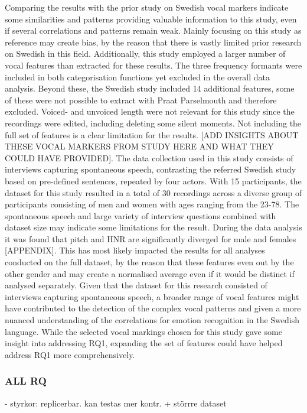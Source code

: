 Comparing the results with the prior study on Swedish vocal markers indicate some similarities and patterns providing valuable information to this study, even if several correlations and patterns remain weak. Mainly focusing on this study as reference may create bias, by the reason that there is vastly limited prior research on Swedish in this field. Additionally, this study employed a larger number of vocal features than extracted for these results. The three frequency formants were included in both categorisation functions yet excluded in the overall data analysis. Beyond these, the Swedish study included 14 additional features, some of these were not possible to extract with Praat Parselmouth and therefore excluded. Voiced- and unvoiced length were not relevant for this study since the recordings were edited, including deleting some silent moments. Not including the full set of features is a clear limitation for the results. [ADD INSIGHTS ABOUT THESE VOCAL MARKERS FROM STUDY HERE AND WHAT THEY COULD HAVE PROVIDED]. The data collection used in this study consists of interviews capturing spontaneous speech, contrasting the referred Swedish study based on pre-defined sentences, repeated by four actors. With 15 participants, the dataset for this study resulted in a total of 30 recordings across a diverse group of participants consisting of men and women with ages ranging from the 23-78. The spontaneous speech and large variety of interview questions combined with dataset size may indicate some limitations for the result. During the data analysis it was found that pitch and HNR are significantly diverged for male and females [APPENDIX]. This has most likely impacted the results for all analyses conducted on the full dataset, by the reason that these features even out by the other gender and may create a normalised average even if it would be distinct if analysed separately. 
Given that the dataset for this research consisted of interviews capturing spontaneous speech, a broader range of vocal features might have contributed to the detection of the complex vocal patterns and given a more
nuanced understanding of the correlations for emotion recognition in the Swedish language. While the selected vocal markings chosen for this study gave some insight into addressing RQ1, expanding the set of features could have helped address RQ1 more comprehensively.


\medskip
\subsubsection{ALL RQ } 
- styrkor: replicerbar. kan testas mer kontr. + störrre dataset 

